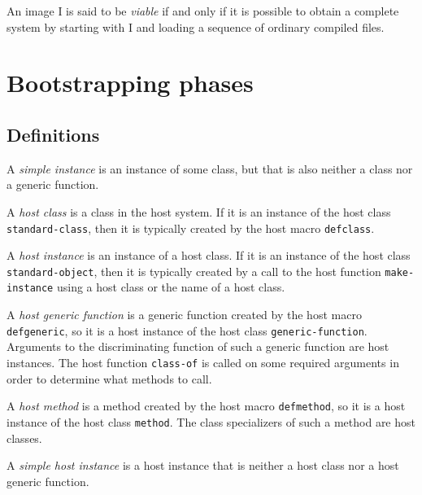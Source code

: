 An image I is said to be \emph{viable} if and only if it is possible
to obtain a complete \commonlisp{} system by starting with I and loading a
sequence of ordinary compiled files.

\section{Bootstrapping phases}

\subsection{Definitions}

\begin{definition}
A \emph{simple instance} is an instance of some class, but that is
also neither a class nor a generic function.
\end{definition}

\begin{definition}
A \emph{host class} is a class in the host system.  If it is an
instance of the host class \texttt{standard-class}, then it is
typically created by the host macro \texttt{defclass}.
\end{definition}

\begin{definition}
A \emph{host instance} is an instance of a host class.  If it is an
instance of the host class \texttt{standard-object}, then it is
typically created by a call to the host function
\texttt{make-instance} using a host class or the name of a host class.
\end{definition}

\begin{definition}
A \emph{host generic function} is a generic function created by the
host macro \texttt{defgeneric}, so it is a host instance of the host
class \texttt{generic-function}.  Arguments to the discriminating
function of such a generic function are host instances.  The host
function \texttt{class-of} is called on some required arguments in
order to determine what methods to call.
\end{definition}

\begin{definition}
A \emph{host method} is a method created by the host macro
\texttt{defmethod}, so it is a host instance of the host class
\texttt{method}.  The class specializers of such a method are host
classes.
\end{definition}

\begin{definition}
A \emph{simple host instance} is a host instance that is neither a
host class nor a host generic function.
\end{definition}

